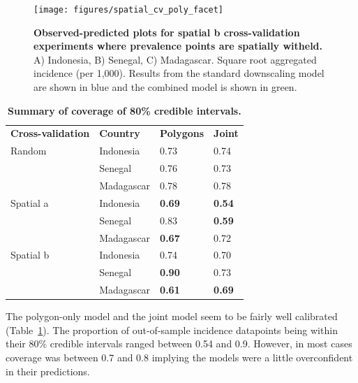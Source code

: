 \documentclass[10pt,letterpaper]{article}
\newlength\savedwidth
\newcommand\thickhline{\noalign{\global\savedwidth\arrayrulewidth\global\arrayrulewidth 2pt}%
\hline
\noalign{\global\arrayrulewidth\savedwidth}}
\begin{document}
\begin{figure}
\texttt{[image: figures/spatial\_cv\_poly\_facet]} 
\caption{{\bf Observed-predicted plots for spatial b cross-validation experiments where prevalence points are spatially witheld.}
A) Indonesia, B) Senegal, C) Madagascar. Square root aggregated incidence (per 1,000).
Results from the standard downscaling model are shown in blue and the combined model is shown in green.
}
\label{spatialpredobspolyfacet}
\end{figure}


\begin{table}[t]
\begin{adjustwidth}{-2.25in}{0in} %
\centering
\caption{
{\bf Summary of coverage of 80\% credible intervals.}}
\begin{tabular}{llll}
\hline
{\bf Cross-validation} & {\bf Country}  & {\bf Polygons} & {\bf Joint} \\
\thickhline 
Random & Indonesia  & 0.73 &  0.74\\
& Senegal  & 0.76 &  0.73\\
& Madagascar  & 0.78 &  0.78\vspace{1mm}\\
 Spatial a & Indonesia  & {\bf 0.69} &  {\bf 0.54}\\
& Senegal  & 0.83 &  {\bf 0.59}\\
& Madagascar  & {\bf 0.67} &  0.72 \vspace{1mm} \\
Spatial b & Indonesia & 0.74 &  0.70\\
& Senegal  & {\bf 0.90} &  0.73\\
& Madagascar  & {\bf 0.61} &  {\bf 0.69}\\

\end{tabular}
\begin{flushleft}

\end{flushleft}
\label{table3}
\end{adjustwidth}
\end{table}





The polygon-only model and the joint model seem to be fairly well calibrated (Table~\ref{table3}).
The proportion of out-of-sample incidence datapoints being within their 80\% credible intervals ranged between 0.54 and 0.9.
However, in most cases coverage was between 0.7 and 0.8 implying the models were a little overconfident in their predictions.
\end{document}
